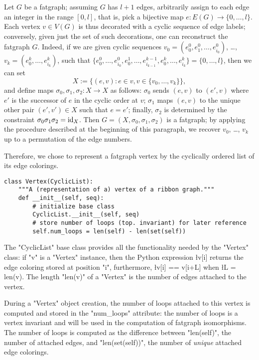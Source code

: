 Let $G$ be a fatgraph; assuming $G$ has $l+1$ edges, arbitrarily
assign to each edge an integer in the range $[0, l]$, that is, pick a
bijective map $e: E(G) \to \{0, \dots, l\}$.  Each vertex $v \in V(G)$
is thus decorated with a cyclic sequence of edge labels; conversely,
given just the set of such decorations, one can reconstruct the
fatgraph $G$.  Indeed, if we are given cyclic sequences $v_0 = (e_0^0,
e^0_1, \ldots, e^0_{i_0})$, \ldots, $v_k = (e^k_0, \ldots,
e^k_{i_k})$, such that $\{e^0_0, \ldots, e^0_{i_0}, e^1_0, \ldots,
e^{k-1}_{i_{k-1}}, e^k_0, \ldots, e^k_{i_k}\} = \{0, \ldots, l\}$,
then we can set
\begin{equation*}
  X := \{ (e, v) : e \in v, v\in \{v_0, \ldots, v_k\} \},
\end{equation*}
and define maps $\sigma_0, \sigma_1, \sigma_2: X \to X$ as follows:
$\sigma_0$ sends $(e, v)$ to $(e', v)$ where $e'$ is the successor of
$e$ in the cyclic order at $v$; $\sigma_1$ maps $(e, v)$ to the unique
other pair $(e', v') \in X$ such that $e = e'$; finally, $\sigma_2$ is
determined by the constraint $\sigma_0\sigma_1\sigma_2 = \operatorname{id}_X$.  Then
$G = (X, \sigma_0, \sigma_1, \sigma_2)$ is a fatgraph; by applying the
procedure described at the beginning of this paragraph, we recover
$v_0$, \ldots, $v_k$ up to a permutation of the edge numbers.

Therefore, we chose to represent a fatgraph vertex by the cyclically
ordered list of its edge colorings.  
\begin{lstlisting}
class Vertex(CyclicList):
    """A (representation of a) vertex of a ribbon graph."""
    def __init__(self, seq):
        # initialize base class
        CyclicList.__init__(self, seq)
        # store number of loops (top. invariant) for later reference
        self.num_loops = len(self) - len(set(self))

\end{lstlisting}
The "CyclicList" base class provides all the functionality needed by
the "Vertex" class: if "v" is a "Vertex" instance, then the
Python expression \l{v[i]} returns the edge coloring stored at
position "i", furthermore, \l{v[i] == v[i+L]} when \l{L = len(v)}.
The length "len(v)" of a "Vertex" is the number of edges attached
to the vertex.  

During a "Vertex" object creation, the number of loops attached to
this vertex is computed and stored in the "num_loops" attribute: the
number of loops is a vertex invariant and will be used in the
computation of fatgraph isomorphisms.  The number of loops is computed
as the difference between "len(self)", the number of attached edges,
and "len(set(self))", the number of \emph{unique} attached edge
colorings. 

